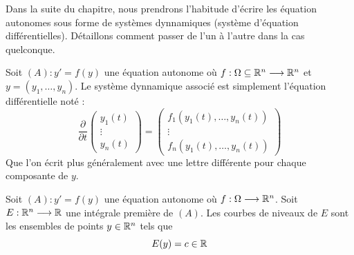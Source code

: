 \begin{proposition}
    Dans la suite du chapitre, nous prendrons l'habitude d'écrire les équation autonomes sous forme de systèmes 
    dynnamiques (système d'équation différentielles). 
    Détaillons comment passer de l'un à l'autre dans la cas quelconque. 
    
    Soit $(A) : y' = f(y)$ une équation autonome où $f : \Omega \subseteq \mathbb{R}^n \longrightarrow \mathbb{R}^n$ et 
    $y = (y_1, \dots, y_n)$. Le système dynnamique associé est simplement l'équation différentielle noté : 
        \[ \frac{\partial}{\partial t} 
        \begin{pmatrix}
            y_1(t) \\ 
            \vdots \\ 
            y_n(t)
        \end{pmatrix}
        = 
        \begin{pmatrix}
            f_1(y_1(t), \dots, y_n(t)) \\ 
            \vdots \\ 
            f_n(y_1(t), \dots, y_n(t)) 
        \end{pmatrix} \] 
    Que l'on écrit plus généralement avec une lettre différente pour chaque composante de $y$. 
\end{proposition}

\begin{definition}
    Soit $(A) : y' = f(y)$ une équation autonome où $f : \Omega \longrightarrow \mathbb{R}^n$. 
    Soit $E : \mathbb{R}^n \longrightarrow \mathbb{R}$ une intégrale première de $(A)$. 
    Les courbes de niveaux de $E$ sont les ensembles de points $y \in \mathbb{R}^n $ tels que 
        \[ E(y) = c \in \mathbb{R} \] 
\end{definition}

